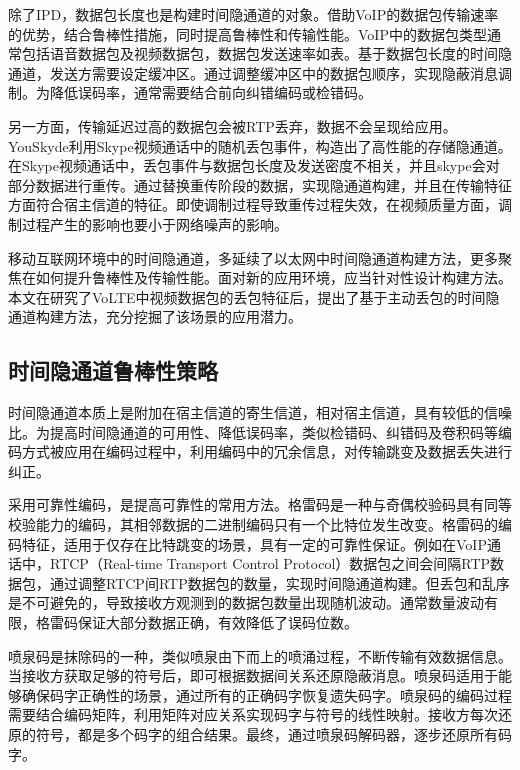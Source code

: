 除了IPD，数据包长度也是构建时间隐通道的对象。借助VoIP的数据包传输速率的优势，结合鲁棒性措施，同时提高鲁棒性和传输性能。VoIP中的数据包类型通常包括语音数据包及视频数据包，数据包发送速率如表。基于数据包长度的时间隐通道，发送方需要设定缓冲区。通过调整缓冲区中的数据包顺序，实现隐蔽消息调制。为降低误码率，通常需要结合前向纠错编码或检错码。

另一方面，传输延迟过高的数据包会被RTP丢弃，数据不会呈现给应用。YouSkyde利用Skype视频通话中的随机丢包事件，构造出了高性能的存储隐通道。在Skype视频通话中，丢包事件与数据包长度及发送密度不相关，并且skype会对部分数据进行重传。通过替换重传阶段的数据，实现隐通道构建，并且在传输特征方面符合宿主信道的特征。即使调制过程导致重传过程失效，在视频质量方面，调制过程产生的影响也要小于网络噪声的影响。

移动互联网环境中的时间隐通道，多延续了以太网中时间隐通道构建方法，更多聚焦在如何提升鲁棒性及传输性能。面对新的应用环境，应当针对性设计构建方法。本文在研究了VoLTE中视频数据包的丢包特征后，提出了基于主动丢包的时间隐通道构建方法，充分挖掘了该场景的应用潜力。

\subsection{时间隐通道鲁棒性策略}
\label{sec:intro:background:robustness}

时间隐通道本质上是附加在宿主信道的寄生信道，相对宿主信道，具有较低的信噪比。为提高时间隐通道的可用性、降低误码率，类似检错码、纠错码及卷积码等编码方式被应用在编码过程中，利用编码中的冗余信息，对传输跳变及数据丢失进行纠正。

采用可靠性编码，是提高可靠性的常用方法。格雷码是一种与奇偶校验码具有同等校验能力的编码，其相邻数据的二进制编码只有一个比特位发生改变。格雷码的编码特征，适用于仅存在比特跳变的场景，具有一定的可靠性保证。例如在VoIP通话中，RTCP（Real-time Transport Control Protocol）数据包之间会间隔RTP数据包，通过调整RTCP间RTP数据包的数量，实现时间隐通道构建。但丢包和乱序是不可避免的，导致接收方观测到的数据包数量出现随机波动。通常数量波动有限，格雷码保证大部分数据正确，有效降低了误码位数。

喷泉码是抹除码的一种，类似喷泉由下而上的喷涌过程，不断传输有效数据信息。当接收方获取足够的符号后，即可根据数据间关系还原隐蔽消息。喷泉码适用于能够确保码字正确性的场景，通过所有的正确码字恢复遗失码字。喷泉码的编码过程需要结合编码矩阵，利用矩阵对应关系实现码字与符号的线性映射。接收方每次还原的符号，都是多个码字的组合结果。最终，通过喷泉码解码器，逐步还原所有码字。

